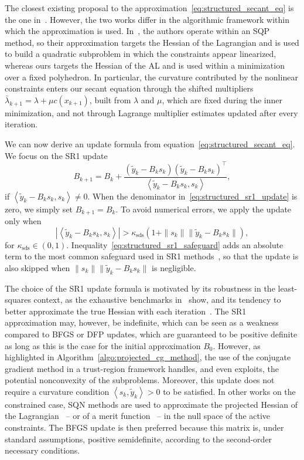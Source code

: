 \documentclass[pdflatex,sn-mathphys-num]{sn-jnl}%
\theoremstyle{thmstyleone}%
\newcommand{\inner}[2]{\left\langle {#1} , {#2} \right\rangle} %
\begin{document}
The closest existing proposal to the approximation~\eqref{eq:structured_secant_eq}  is the one in~\cite{li-etal:2002}. However, the two works differ in the algorithmic framework within which the approximation is used. In~\cite{li-etal:2002}, the authors operate within an SQP method, so their approximation targets the Hessian of the Lagrangian and is used to build a quadratic subproblem in which the constraints appear linearized, whereas ours targets the Hessian of the AL and is used within a minimization over a fixed polyhedron. In particular, the curvature contributed by the nonlinear constraints enters our secant equation through the shifted multipliers $\bar{\lambda}_{k+1} = \lambda + \mu c(x_{k+1})$, built from $\lambda$ and $\mu$, which are fixed during the inner minimization, and not through Lagrange multiplier estimates updated after every iteration.


We can now derive an update formula from equation~\eqref{eq:structured_secant_eq}. We focus on the SR1 update
\begin{equation}\label{eq:structured_sr1_update}
	B_{k+1} = B_k + \dfrac{(\tilde{y}_k-B_ks_k)(\tilde{y}_k-B_ks_k)^\top}{\inner{\tilde{y}_k-B_ks_k}{s_k}},
\end{equation}
if $\inner{\tilde{y}_k-B_ks_k}{s_k} \neq 0$. When the denominator in~\eqref{eq:structured_sr1_update} is zero, we simply set $B_{k+1}=B_k$. To avoid numerical errors, we apply the update only when
\begin{equation}\label{eq:structured_sr1_safeguard}
	\left|\inner{\tilde{y}_k-B_ks_k}{s_k}\right| > \kappa_{\mathrm{sds}}\left(1 + \|s_k\|\|\tilde{y}_k-B_ks_k\|\right),
\end{equation}
for $\kappa_{\mathrm{sds}} \in (0,1)$. Inequality~\eqref{eq:structured_sr1_safeguard} adds an absolute term to the most common safeguard used in SR1 methods~\cite[Section~6.2]{nocedalwright:2006}, so that the update is also skipped when $\|s_k\|\|\tilde{y}_k-B_ks_k\|$ is negligible.

The choice of the SR1 update formula is motivated by its robustness in the least-squares context, as the exhaustive benchmarks in~\cite{lucksan-etal:2019} show, and its tendency to better approximate the true Hessian with each iteration~\cite{conn-etal:1991a}. The SR1 approximation may, however, be indefinite, which can be seen as a weakness compared to BFGS or DFP updates, which are guaranteed to be positive definite as long as this is the case for the initial approximation $B_0$. However, as highlighted in Algorithm~\ref{algo:projected_cg_method}, the use of the conjugate gradient method in a trust-region framework handles, and even exploits, the potential nonconvexity of the subproblems. Moreover, this update does not require a curvature condition $\inner{s_k}{\tilde{y}_k} > 0$ to be satisfied. In other works on the constrained case, SQN methods are used to approximate the projected Hessian of the Lagrangian~\cite{tjoabiegler:1991} -- or of a merit function~\cite{amiribartels:1989} -- in the null space of the active constraints. The BFGS update is then preferred because this matrix is, under standard assumptions, positive semidefinite, according to the second-order necessary conditions.
\end{document}
